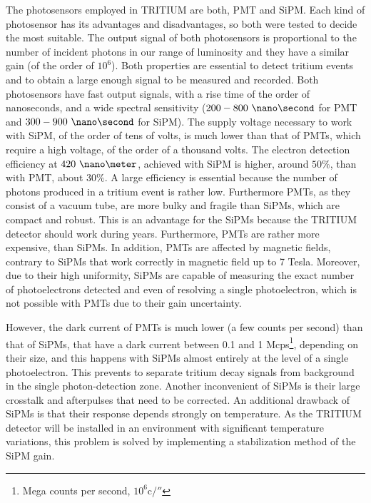 The photosensors employed in TRITIUM are both, PMT and SiPM. Each kind of photosensor has its advantages and disadvantages, so both were tested to decide the most suitable. The output signal of both photosensors is proportional to the number of incident photons in our range of luminosity and they have a similar gain (of the order of $10^6$). Both properties are essential to detect tritium events and to obtain a large enough signal to be measured and recorded. Both photosensors have fast output signals, with a rise time of the order of nanoseconds, and a wide spectral sensitivity ($200-800~\nano\second$ for PMT and $300-900~\nano\second$ for SiPM). The supply voltage necessary to work with SiPM, of the order of tens of volts, is much lower than that of PMTs, which require a high voltage, of the order of a thousand volts. The electron detection efficiency at $420~\nano\meter$,  achieved with SiPM is higher, around $50\%$, than with PMT, about $30\%$. A large efficiency is essential because the number of photons produced in a tritium event is rather low. Furthermore PMTs, as they consist of a vacuum tube, are more bulky and fragile than SiPMs, which are compact and robust. This is an advantage for the SiPMs because the TRITIUM detector should work during years. Furthermore, PMTs are rather more expensive, than SiPMs. In addition, PMTs are affected by magnetic fields, contrary to SiPMs that work correctly in magnetic field up to 7 Tesla. Moreover, due to their high uniformity, SiPMs are capable of measuring the exact number of photoelectrons detected and even of resolving a single photoelectron, which is not possible with PMTs due to their gain uncertainty.

However, the dark current of PMTs is much lower (a few counts per second) than that of SiPMs, that have a dark current between 0.1 and 1 Mcps\footnote{Mega counts per second, $10^6$c/$\second$}, depending on their size, and this happens with SiPMs almost entirely at the level of a single photoelectron. This prevents to separate tritium decay signals from background in the single photon-detection zone. Another inconvenient of SiPMs is their large crosstalk and afterpulses that need to be corrected. An additional drawback of SiPMs is that their response depends strongly on temperature. As the TRITIUM detector will be installed in an environment with significant temperature variations, this problem is solved by implementing a stabilization method of the SiPM gain.